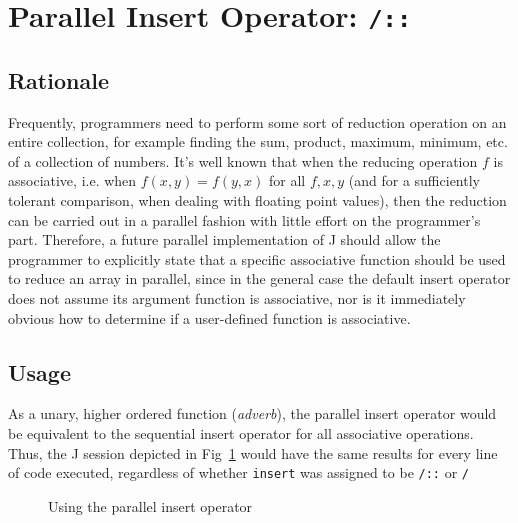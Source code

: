 \pagebreak

\section{Parallel Insert Operator: \texttt{/::}}
\label{pins}
\subsection{Rationale}
Frequently, programmers need to perform some sort of reduction operation on an entire collection, 
for example finding the sum, product, maximum, minimum, etc. of a collection of numbers.
It's well known that when the reducing operation $f$ is associative, 
i.e. when $f(x,y) = f(y,x)$ for all $f, x, y$ (and for a sufficiently tolerant comparison, when dealing with floating point values),
then the reduction can be carried out in a parallel fashion with little effort on the programmer's part.
Therefore, a future parallel implementation of J should allow the programmer 
to explicitly state that a specific associative function should be used to reduce an array in parallel, 
since in the general case the default insert operator does not assume its argument function is associative, 
nor is it immediately obvious how to determine if a user-defined function is associative.

\subsection{Usage}
As a unary, higher ordered function (\textit{adverb}), 
the parallel insert operator would be equivalent to the sequential insert operator 
for all associative operations. 
Thus, the J session depicted in Fig~\ref{fig::pinsert} would have the same results for every line of code executed, 
regardless of whether \texttt{insert} was assigned to be \texttt{/::} or \texttt{/}


\begin{figure}[h]
\begin{quote}
\begin{singlespacing}
\begin{small}
\end{small}
\end{singlespacing}
\end{quote}
\caption{Using the parallel insert operator}
\label{fig::pinsert}
\end{figure}

